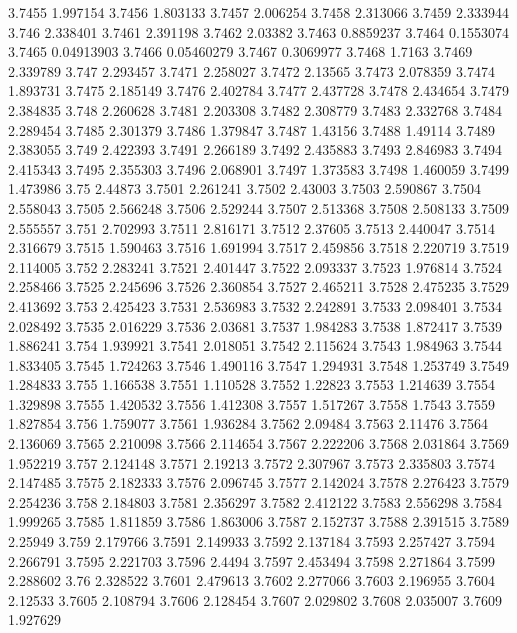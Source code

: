3.7455  1.997154
3.7456  1.803133
3.7457  2.006254
3.7458  2.313066
3.7459  2.333944
3.746  2.338401
3.7461  2.391198
3.7462  2.03382
3.7463  0.8859237
3.7464  0.1553074
3.7465  0.04913903
3.7466  0.05460279
3.7467  0.3069977
3.7468  1.7163
3.7469  2.339789
3.747  2.293457
3.7471  2.258027
3.7472  2.13565
3.7473  2.078359
3.7474  1.893731
3.7475  2.185149
3.7476  2.402784
3.7477  2.437728
3.7478  2.434654
3.7479  2.384835
3.748  2.260628
3.7481  2.203308
3.7482  2.308779
3.7483  2.332768
3.7484  2.289454
3.7485  2.301379
3.7486  1.379847
3.7487  1.43156
3.7488  1.49114
3.7489  2.383055
3.749  2.422393
3.7491  2.266189
3.7492  2.435883
3.7493  2.846983
3.7494  2.415343
3.7495  2.355303
3.7496  2.068901
3.7497  1.373583
3.7498  1.460059
3.7499  1.473986
3.75  2.44873
3.7501  2.261241
3.7502  2.43003
3.7503  2.590867
3.7504  2.558043
3.7505  2.566248
3.7506  2.529244
3.7507  2.513368
3.7508  2.508133
3.7509  2.555557
3.751  2.702993
3.7511  2.816171
3.7512  2.37605
3.7513  2.440047
3.7514  2.316679
3.7515  1.590463
3.7516  1.691994
3.7517  2.459856
3.7518  2.220719
3.7519  2.114005
3.752  2.283241
3.7521  2.401447
3.7522  2.093337
3.7523  1.976814
3.7524  2.258466
3.7525  2.245696
3.7526  2.360854
3.7527  2.465211
3.7528  2.475235
3.7529  2.413692
3.753  2.425423
3.7531  2.536983
3.7532  2.242891
3.7533  2.098401
3.7534  2.028492
3.7535  2.016229
3.7536  2.03681
3.7537  1.984283
3.7538  1.872417
3.7539  1.886241
3.754  1.939921
3.7541  2.018051
3.7542  2.115624
3.7543  1.984963
3.7544  1.833405
3.7545  1.724263
3.7546  1.490116
3.7547  1.294931
3.7548  1.253749
3.7549  1.284833
3.755  1.166538
3.7551  1.110528
3.7552  1.22823
3.7553  1.214639
3.7554  1.329898
3.7555  1.420532
3.7556  1.412308
3.7557  1.517267
3.7558  1.7543
3.7559  1.827854
3.756  1.759077
3.7561  1.936284
3.7562  2.09484
3.7563  2.11476
3.7564  2.136069
3.7565  2.210098
3.7566  2.114654
3.7567  2.222206
3.7568  2.031864
3.7569  1.952219
3.757  2.124148
3.7571  2.19213
3.7572  2.307967
3.7573  2.335803
3.7574  2.147485
3.7575  2.182333
3.7576  2.096745
3.7577  2.142024
3.7578  2.276423
3.7579  2.254236
3.758  2.184803
3.7581  2.356297
3.7582  2.412122
3.7583  2.556298
3.7584  1.999265
3.7585  1.811859
3.7586  1.863006
3.7587  2.152737
3.7588  2.391515
3.7589  2.25949
3.759  2.179766
3.7591  2.149933
3.7592  2.137184
3.7593  2.257427
3.7594  2.266791
3.7595  2.221703
3.7596  2.4494
3.7597  2.453494
3.7598  2.271864
3.7599  2.288602
3.76  2.328522
3.7601  2.479613
3.7602  2.277066
3.7603  2.196955
3.7604  2.12533
3.7605  2.108794
3.7606  2.128454
3.7607  2.029802
3.7608  2.035007
3.7609  1.927629
